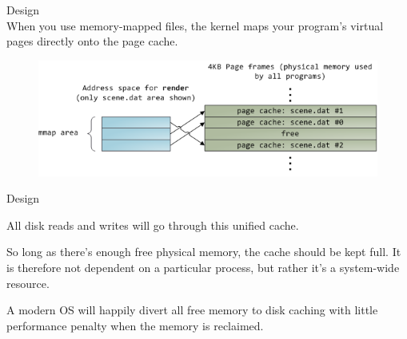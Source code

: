 \begin{frame}[plain,t]{Design} %
     \\
    \vspace{2ex}
    When you use {\color{red}memory-mapped files}, the kernel maps your program's virtual pages directly onto the page cache.
    
    \vspace{2ex}
    \begin{figure}
        \centering
        \includegraphics[width=0.9\linewidth]{image/0216}
        \label{fig:0216}
    \end{figure}
    
\end{frame}
\begin{frame}[plain,t]{Design} %
     \\
    \vspace{2ex}
    
    All disk reads and writes will go through this unified cache. 
    
    \vspace{2ex}
    So long as there's enough free physical memory, the cache should be kept full. It is therefore not dependent on a particular process, but rather it's a system-wide resource. 
    
    
    \vspace{2ex}
    A modern OS will happily divert all free memory to disk caching with little performance penalty when the memory is reclaimed.
    
    
    
\end{frame}
